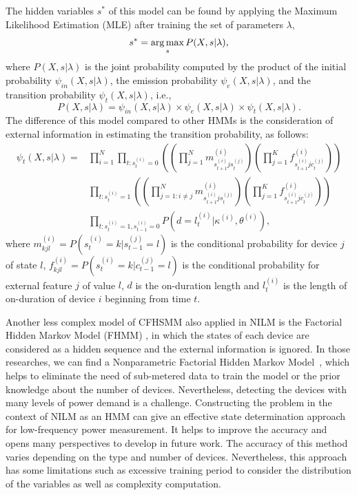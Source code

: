 The hidden variables $s^*$ of this model can be found by applying the Maximum Likelihood Estimation (MLE) after training the set of parameters $\lambda$,
\begin{equation}
s^*=\operatorname*{arg\,max}_{s}{P(X,s|\lambda)},
\end{equation}
where $P(X,s|\lambda)$ is the joint probability computed by the product of the initial probability $\psi_{in}(X,s|\lambda)$, the emission probability $\psi_e(X,s|\lambda)$, and the transition probability $\psi_t(X,s|\lambda)$, i.e.,
\begin{equation}
P(X,s|\lambda)=\psi_{in}(X,s|\lambda)\times \psi_e(X,s|\lambda)\times \psi_t(X,s|\lambda).
\end{equation}
The difference of this model compared to other HMMs is the consideration of external information in estimating the transition probability, as follows:
\begin{equation}
\begin{split}
\psi_t(X,s|\lambda)=&\prod_{i=1}^{N}{\prod_{t:s_t^{(i)}=0}{\left(\left(\prod_{j=1}^N{m_{s_{t+1}^{(i)}js_t^{(j)}}^{(i)}} \right) \left(\prod_{j=1}^K{f_{s_{t+1}^{(i)}jc_t^{(j)}}^{(i)}}\right)\right)}}\\
&\prod_{t:s_t^{(i)}=1}{\left(\left(\prod_{j=1:i\neq j}^N{m_{s_{t+1}^{(i)}js_t^{(j)}}^{(i)}} \right)\left(\prod_{j=1}^K{f_{s_{t+1}^{(i)}jc_t^{(j)}}^{(i)}}\right)\right)}\\
&\prod_{t:s_t^{(i)}=1,s_{t-1}^{(i)}=0}P(d=l_t^{(i)}|\kappa^{(i)},\theta^{(i)}),
\end{split}
\end{equation}
where $m_{kjl}^{(i)} = P(s_{t}^{(i)}=k|s_{t-1}^{(j)}=l)$ is the conditional probability for device $j$ of state $l$, $f_{kjl}^{(i)} = P(s_{t}^{(i)}=k|c_{t-1}^{(j)}=l)$ is the conditional probability for external feature $j$ of value $l$, $d$ is the on-duration length and $l_t^{(i)}$ is the length of on-duration of device $i$ beginning from time $t$.

Another less complex model of CFHSMM also applied in NILM is the Factorial Hidden Markov Model (FHMM) \cite{Kolter11redd,Nambi13,Lukaszewski13,Zoha13,Jia15}, in which the states of each device are considered as a hidden sequence and the external information is ignored. In those researches, we can find a Nonparametric Factorial Hidden Markov Model~\cite{Jia15}, which helps to eliminate the need of sub-metered data to train the model or the prior knowledge about the number of devices. Nevertheless, detecting the devices with many levels of power demand is a challenge. Constructing the problem in the context of NILM as an HMM can give an effective state determination approach for low-frequency power measurement. It helps to improve the accuracy and opens many perspectives to develop in future work. The accuracy of this method varies depending on the type and number of devices. Nevertheless, this approach has some limitations such as excessive training period to consider the distribution of the variables as well as complexity computation.







